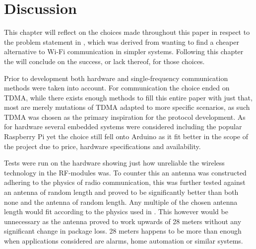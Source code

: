 \chapter{Discussion}\label{Discussion}
This chapter will reflect on the choices made throughout this paper in respect to the problem statement in , which was derived from wanting to find a cheaper alternative to Wi-Fi communication in simpler systems.
Following this chapter the  will conclude on the success, or lack thereof, for those choices.

\bigskip \noindent
Prior to development both hardware and single-frequency communication methods were taken into account.
For communication the choice ended on TDMA, while there exists enough methods to fill this entire paper with just that, most are merely mutations of TDMA adapted to more specific scenarios, as such TDMA was chosen as the primary inspiration for the protocol development.
As for hardware several embedded systems were considered including the popular Raspberry Pi yet the choice still fell onto Arduino as it fit better in the scope of the project due to price, hardware specifications and availability.

Tests were run on the hardware showing just how unreliable the wireless technology in the RF-modules was.
To counter this an antenna was constructed adhering to the physics of radio communication, this was further tested against an antenna of random length and proved to be significantly better than both none and the antenna of random length.
Any multiple of the chosen antenna length would fit according to the physics used in .
This however would be unnecessary as the antenna proved to work upwards of 28 meters without any significant change in package loss.
28 meters happens to be more than enough when applications considered are alarms, home automation or similar systems.


